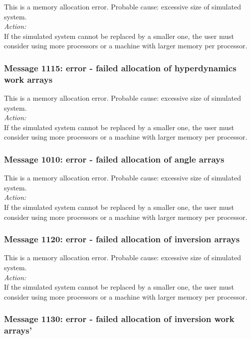 This is a memory allocation error. Probable cause: excessive size of
simulated system. \\

\noindent
{\em Action:}\\
If the simulated system cannot be replaced by a smaller one, the user
must consider using more processors or a machine with larger memory
per processor.

\subsubsection*{Message 1115: error - failed allocation of hyperdynamics
work arrays}

This is a memory allocation error. Probable cause: excessive size of
simulated system. \\

\noindent
{\em Action:}\\
If the simulated system cannot be replaced by a smaller one, the user
must consider using more processors or a machine with larger memory
per processor.

\subsubsection*{Message 1010: error - failed allocation of angle
arrays}

This is a memory allocation error. Probable cause: excessive size of
simulated system. \\

\noindent
{\em Action:}\\
If the simulated system cannot be replaced by a smaller one, the user
must consider using more processors or a machine with larger memory
per processor.

\subsubsection*{Message 1120: error - failed allocation of inversion
arrays}

This is a memory allocation error. Probable cause: excessive size of
simulated system. \\

\noindent
{\em Action:}\\
If the simulated system cannot be replaced by a smaller one, the user
must consider using more processors or a machine with larger memory
per processor.

\subsubsection*{Message 1130: error - failed allocation of inversion
work arrays'}

